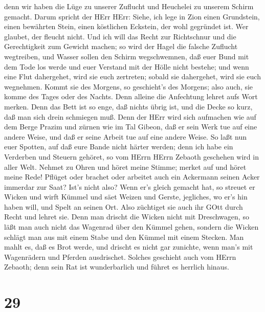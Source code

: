 denn wir haben die Lüge zu unserer Zuflucht und Heuchelei zu unserem
Schirm gemacht.  Darum spricht der HErr HErr: Siehe, ich
lege in Zion einen Grundstein, einen bewährten Stein, einen köstlichen
Eckstein, der wohl gegründet ist. Wer glaubet, der fleucht nicht.
 Und ich will das Recht zur Richtschnur und die
Gerechtigkeit zum Gewicht machen; so wird der Hagel die falsche Zuflucht
wegtreiben, und Wasser sollen den Schirm wegschwemnen,  daß
euer Bund mit dem Tode los werde und euer Verstand mit der Hölle nicht
bestehe; und wenn eine Flut dahergehet, wird sie euch zertreten; sobald
sie dahergehet, wird sie euch wegnehmen.  Kommt sie des
Morgens, so geschieht's des Morgens; also auch, sie komme des Tages oder
des Nachts. Denn alleine die Anfechtung lehret aufs Wort merken.
 Denn das Bett ist so enge, daß nichts übrig ist, und die
Decke so kurz, daß man sich drein schmiegen muß.  Denn der
HErr wird sich aufmachen wie auf dem Berge Prazim und zürnen wie im Tal
Gibeon, daß er sein Werk tue auf eine andere Weise, und daß er seine
Arbeit tue auf eine andere Weise.  So laßt nun euer
Spotten, auf daß eure Bande nicht härter werden; denn ich habe ein
Verderben und Steuern gehöret, so vom HErrn HErrn Zebaoth geschehen wird
in aller Welt.  Nehmet zu Ohren und höret meine Stimme;
merket auf und höret meine Rede!  Pflüget oder brachet oder
arbeitet auch ein Ackermann seinen Acker immerdar zur Saat?
 Ist's nicht also? Wenn er's gleich gemacht hat, so streuet
er Wicken und wirft Kümmel und säet Weizen und Gerste, jegliches, wo
er's hin haben will, und Spelt an seinen Ort.  Also
züchtiget sie auch ihr GOtt durch Recht und lehret sie. 
Denn man drischt die Wicken nicht mit Dreschwagen, so läßt man auch
nicht das Wagenrad über den Kümmel gehen, sondern die Wicken schlägt man
aus mit einem Stabe und den Kümmel mit einem Stecken.  Man
mahlt es, daß es Brot werde, und drischt es nicht gar zunichte, wenn
man's mit Wagenrädern und Pferden ausdrischet.  Solches
geschieht auch vom HErrn Zebaoth; denn sein Rat ist wunderbarlich und
führet es herrlich hinaus.

\hypertarget{section-28}{%
\section{29}\label{section-28}}

